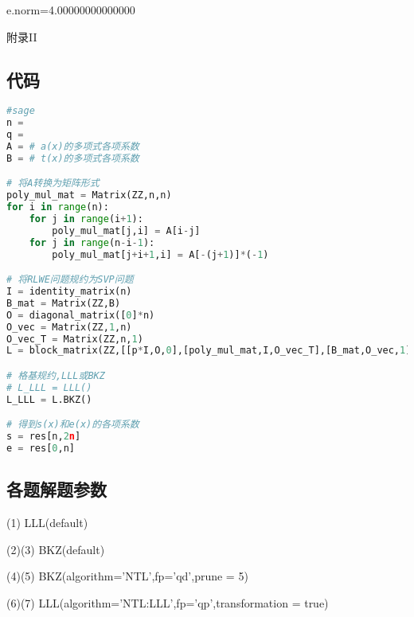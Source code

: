 \documentclass[12pt,a4paper]{article}
\numberwithin{equation}{section}
\begin{document}
e.norm=4.00000000000000

\hspace*{\fill}

{\centering\heiti\fontsize{14pt}{21pt}\selectfont 附录II \; \par}
\vspace{1em}
\setcounter{subsection}{0}
\renewcommand{\thesubsection}{\arabic{subsection}}
\subsection{代码}

\begin{lstlisting}[language=Python]
#sage
n = 
q = 
A = # a(x)的多项式各项系数
B = # t(x)的多项式各项系数

# 将A转换为矩阵形式
poly_mul_mat = Matrix(ZZ,n,n)
for i in range(n):
    for j in range(i+1):
        poly_mul_mat[j,i] = A[i-j]
    for j in range(n-i-1):
        poly_mul_mat[j+i+1,i] = A[-(j+1)]*(-1)

# 将RLWE问题规约为SVP问题
I = identity_matrix(n)
B_mat = Matrix(ZZ,B)
O = diagonal_matrix([0]*n)
O_vec = Matrix(ZZ,1,n)
O_vec_T = Matrix(ZZ,n,1)
L = block_matrix(ZZ,[[p*I,O,0],[poly_mul_mat,I,O_vec_T],[B_mat,O_vec,1]]) # kannan embedding

# 格基规约,LLL或BKZ
# L_LLL = LLL()
L_LLL = L.BKZ()

# 得到s(x)和e(x)的各项系数
s = res[n,2n]
e = res[0,n]
\end{lstlisting}

\subsection{各题解题参数}

(1) LLL(default)

(2)(3) BKZ(default)

(4)(5) BKZ(algorithm='NTL',fp='qd',prune = 5)

(6)(7) LLL(algorithm='NTL:LLL',fp='qp',transformation = true)

\vspace{1em}

{\songti\fontsize{12pt}{18pt}\selectfont
	
}
%
\end{document}
